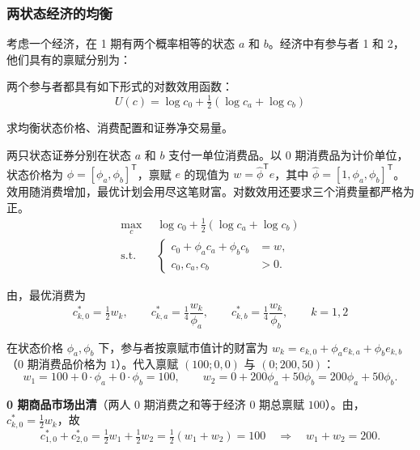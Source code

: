 \subsubsection{两状态经济的均衡}
\begin{tcolorbox}[example]
\begin{question}
 考虑一个经济，在 1 期有两个概率相等的状态 $a$ 和 $b$。经济中有参与者 1 和 2，他们具有的禀赋分别为：
\begin{center}
\qquad
{}
\end{center}
两个参与者都具有如下形式的对数效用函数：
\[
    U(c)=\log c_{0}+\tfrac12(\log c_{a}+\log c_{b})
\]

求均衡状态价格、消费配置和证券净交易量。
\end{question}
\begin{solution}[blank-type=manual,blank-vsep=5\baselineskip]
两只状态证券分别在状态 $a$ 和 $b$ 支付一单位消费品。以 0 期消费品为计价单位，状态价格为 $\phi=[\phi_a,\phi_b]^{\mathsf T}$，禀赋 $e$ 的现值为 $w=\hat\phi^{\mathsf T}e$，其中 $\hat\phi=[1,\phi_a,\phi_b]^{\mathsf T}$。效用随消费增加，最优计划会用尽这笔财富。对数效用还要求三个消费量都严格为正。
\[
    \begin{aligned}
        \max_{c}\ &\log c_{0}+\tfrac12(\log c_{a}+\log c_{b})\\
        \mathrm{s.t.}\quad &
        \left\{\begin{aligned}
            c_{0}+\phi_{a}c_{a}+\phi_{b}c_{b}&=w,\\
            c_{0},c_{a},c_{b}&>0.
        \end{aligned}\right.
    \end{aligned}
\]

由，最优消费为
\[
    c_{k,0}^{*}=\tfrac12 w_{k},\qquad
    c_{k,a}^{*}=\tfrac14\frac{w_{k}}{\phi_{a}},\qquad
    c_{k,b}^{*}=\tfrac14\frac{w_{k}}{\phi_{b}},\qquad k=1,2
\]

在状态价格 $\phi_{a},\phi_{b}$ 下，参与者按禀赋市值计的财富为 $w_{k}=e_{k,0}+\phi_{a}e_{k,a}+\phi_{b}e_{k,b}$（0 期消费品价格为 $1$）。代入禀赋 $(100;0,0)$ 与 $(0;200,50)$：
\[
    w_{1}=100+0\cdot\phi_{a}+0\cdot\phi_{b}=100,\qquad
    w_{2}=0+200\phi_{a}+50\phi_{b}=200\phi_{a}+50\phi_{b}.
\]

\textbf{0 期商品市场出清}（两人 0 期消费之和等于经济 0 期总禀赋 $100$）。由，$c_{k,0}^{*}=\tfrac12 w_{k}$，故
\[
    c_{1,0}^{*}+c_{2,0}^{*}=\tfrac12 w_{1}+\tfrac12 w_{2}=\tfrac12(w_{1}+w_{2})=100
    \quad\Longrightarrow\quad w_{1}+w_{2}=200.
\]


\end{solution}
\end{tcolorbox}
